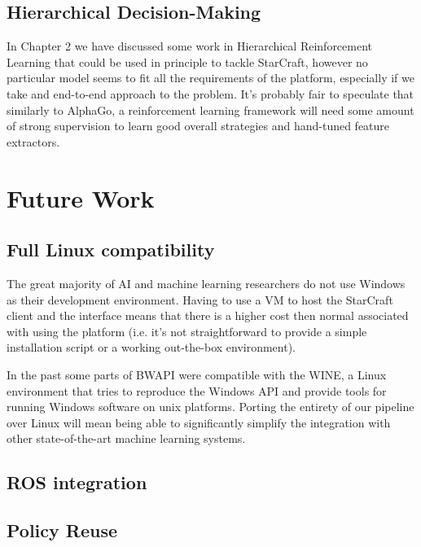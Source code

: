 \subsection{Hierarchical Decision-Making}

In Chapter 2 we have discussed some work in Hierarchical Reinforcement Learning
that could be used in principle to tackle StarCraft, however no particular model
seems to fit all the requirements of the platform, especially if we take and
end-to-end approach to the problem. It's probably fair to speculate that
similarly to AlphaGo, a reinforcement learning framework will need some amount
of strong supervision to learn good overall strategies and hand-tuned feature
extractors.


\section{Future Work}

\subsection{Full Linux compatibility}

The great majority of AI and machine learning researchers do not use Windows as
their development environment. Having to use a VM to host the StarCraft client
and the interface means that there is a higher cost then normal associated with
using the platform (i.e. it's not straightforward to provide a simple
installation script or a working out-the-box environment).

In the past some parts of BWAPI were compatible with the WINE, a Linux
environment that tries to reproduce the Windows API and provide tools for
running Windows software on unix platforms. Porting the entirety of our pipeline
over Linux will mean being able to significantly simplify the integration with
other state-of-the-art machine learning systems. 

\subsection{ROS integration}




\subsection{Policy Reuse}

